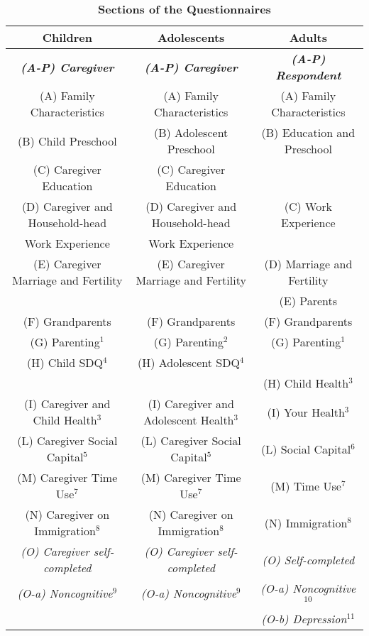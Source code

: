 \documentclass{article}
\begin{document}
\begin{table}
\caption{\textbf{Sections of the Questionnaires}}
\scriptsize
\label{tab:SecQuest}
\vspace{-5mm}
\begin{center}
\begin{tabular}{ c c c }
\hline\hline
\textbf{Children} & \textbf{Adolescents} & \textbf{Adults}\\
\hline
\textbf{\textit{(A-P) Caregiver}} & \textbf{\textit{(A-P) Caregiver}} & \textbf{\textit{(A-P) Respondent}}\\
\hline
(A) Family Characteristics & (A) Family Characteristics & (A) Family Characteristics \\
(B) Child Preschool & (B) Adolescent Preschool & (B) Education and Preschool \\
(C) Caregiver Education & (C) Caregiver Education & \\
(D) Caregiver and Household-head & (D) Caregiver and Household-head & (C) Work Experience \\
     Work Experience & Work Experience & \\
(E) Caregiver Marriage and Fertility & (E) Caregiver Marriage and Fertility & (D) Marriage and Fertility \\
 &  & (E) Parents \\
(F) Grandparents & (F) Grandparents & (F) Grandparents \\
(G) Parenting$^{1}$ & (G) Parenting$^{2}$ & (G) Parenting$^{1}$ \\
(H) Child SDQ$^{4}$ & (H) Adolescent SDQ$^{4}$ &  \\
 &  & (H) Child Health$^{3}$ \\
(I) Caregiver and Child Health$^{3}$ & (I) Caregiver and Adolescent Health$^{3}$ & (I) Your Health$^{3}$ \\
(L) Caregiver Social Capital$^{5}$ & (L) Caregiver Social Capital$^{5}$ & (L) Social Capital$^{6}$ \\
(M) Caregiver Time Use$^{7}$ & (M) Caregiver Time Use$^{7}$ & (M) Time Use$^{7}$ \\
(N) Caregiver on Immigration$^{8}$ & (N) Caregiver on Immigration$^{8}$ & (N) Immigration$^{8}$ \\
\textit{(O) Caregiver self-completed} & \textit{(O) Caregiver self-completed} & \textit{(O) Self-completed} \\
\textit{(O-a) Noncognitive$^{9}$} & \textit{(O-a) Noncognitive$^{9}$} & \textit{(O-a) Noncognitive$^{10}$} \\
 &  & \textit{(O-b) Depression$^{11}$} \\

\end{tabular}
\end{center}
\end{table}
\end{document}
